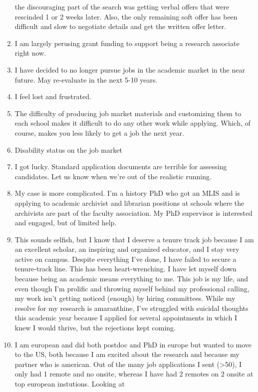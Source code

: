 \documentclass[]{article}
\begin{document}
\begin{enumerate}
  the discouraging part of the search was getting verbal offers that
  were rescinded 1 or 2 weeks later. Also, the only remaining soft offer
  has been difficult and slow to negotiate details and get the written
  offer letter.
\item
  I am largely perusing grant funding to support being a research
  associate right now.
\item
  I have decided to no longer pursue jobs in the academic market in the
  near future. May re-evaluate in the next 5-10 years.
\item
  I feel lost and frustrated.
\item
  The difficulty of producing job market materials and customizing them
  to each school makes it difficult to do any other work while applying.
  Which, of course, makes you less likely to get a job the next year.
\item
  Disability status on the job market
\item
  I got lucky. Standard application documents are terrible for assessing
  candidates. Let us know when we're out of the realistic running.
\item
  My case is more complicated. I'm a history PhD who got an MLIS and is
  applying to academic archivist and librarian positions at schools
  where the archivists are part of the faculty association. My PhD
  supervisor is interested and engaged, but of limited help.
\item
  This sounds selfish, but I know that I deserve a tenure track job
  because I am an excellent scholar, an inspiring and organized
  educator, and I stay very active on campus. Despite everything I've
  done, I have failed to secure a tenure-track line. This has been
  heart-wrenching. I have let myself down because being an academic
  means everything to me. This job is my life, and even though I'm
  prolific and throwing myself behind my professional calling, my work
  isn't getting noticed (enough) by hiring committees. While my resolve
  for my research is amaranthine, I've struggled with suicidal thoughts
  this academic year because I applied for several appointments in which
  I knew I would thrive, but the rejections kept coming.
\item
  I am european and did both postdoc and PhD in europe but wanted to
  move to the US, both because I am excited about the research and
  because my partner who is american. Out of the many job applications I
  sent (\textgreater{}50), I only had 1 remote and no onsite, whereas I
  have had 2 remotes on 2 onsite at top european instutions. Looking at

\end{enumerate}
\end{document}
